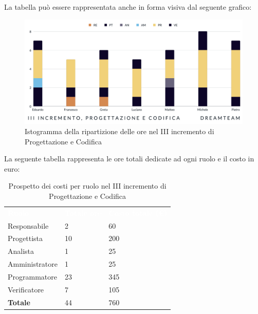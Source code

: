 La tabella può essere rappresentata anche in forma visiva dal seguente grafico:
\begin{figure}[H]
\centering
\includegraphics[scale=0.55]{Sezioni/SezioniPreventivo/grafici/Preventivo_progettazione_III.png}
\caption{Istogramma della ripartizione delle ore nel III incremento di Progettazione e Codifica}
\end{figure}

La seguente tabella rappresenta le ore totali dedicate ad ogni ruolo e il costo in euro:

\begin{table}[H]
\begin{center}
\renewcommand{\arraystretch}{1.5}
\begin{tabular}{ m{}<{\centering}  m{}<{\centering} m{}<{\centering}}
	\rowcolor{darkblue}
	\textcolor{white}{\textbf{Ruolo}}&\textcolor{white}{\textbf{Totale ore}}&\textcolor{white}{\textbf{Costo totale (\euro)}}\\ 

	Responsabile  & 2 & 60 \\	
	
	Progettista & 10 & 200 \\
	
	Analista & 1 & 25 \\

	Amministratore & 1 & 25 \\
	
	Programmatore & 23 & 345 \\
	
	Verificatore & 7 & 105 \\
	
	\textbf{Totale} & 44 & 760 \\
	
\end{tabular}
\caption{Prospetto dei costi per ruolo nel III incremento di Progettazione e Codifica}
\end{center}
\end{table}

